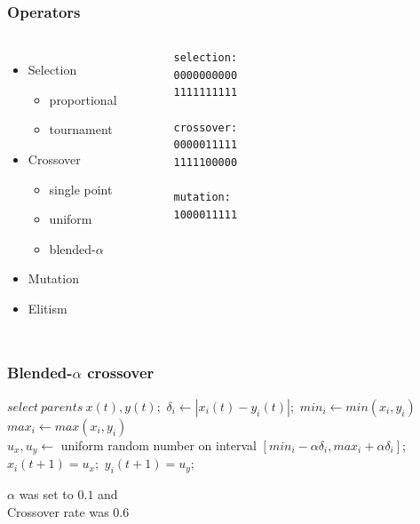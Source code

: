 \documentclass{beamer}
\begin{document}
\begin{frame}[fragile]
  \frametitle{Operators}

  \begin{columns}[lT] %
    \begin{itemize}
      \item Selection
      \begin{itemize}
	\item proportional
	\item tournament
      \end{itemize}
      \item Crossover
      \begin{itemize}
	\item single point
	\item uniform
	\item blended-$\alpha$
      \end{itemize}
      \item Mutation 
      \item Elitism
    \end{itemize}
    
    \scriptsize
    \begin{verbatim}
      selection:
      0000000000
      1111111111

      crossover:
      0000011111
      1111100000

      mutation:
      1000011111
    \end{verbatim}
    
  \end{columns}

\end{frame}


\begin{frame}[fragile]
  \frametitle{Blended-$\alpha$ crossover}
  \begin{algorithmic}
    \STATE $select\: parents\: x(t), y(t);$
      \STATE $\delta_i \gets |x_i(t) - y_i(t)|;$
      \STATE $min_i \gets  min(x_i,y_i)$\\
      \STATE $max_i \gets max(x_i,y_i)$\\
      \STATE $u_x, u_y \gets$ uniform random number on interval $[min_i-\alpha \delta_i, max_i+\alpha \delta_i]$;
      \STATE $x_i(t+1) = u_x;$
      \STATE $y_i(t+1) = u_y;$
    \ENDFOR
  \end{algorithmic}
  
  \bigskip
  $\alpha$ was set to $0.1$ and \\
  Crossover rate was 0.6\\
\end{frame}
\end{document}
